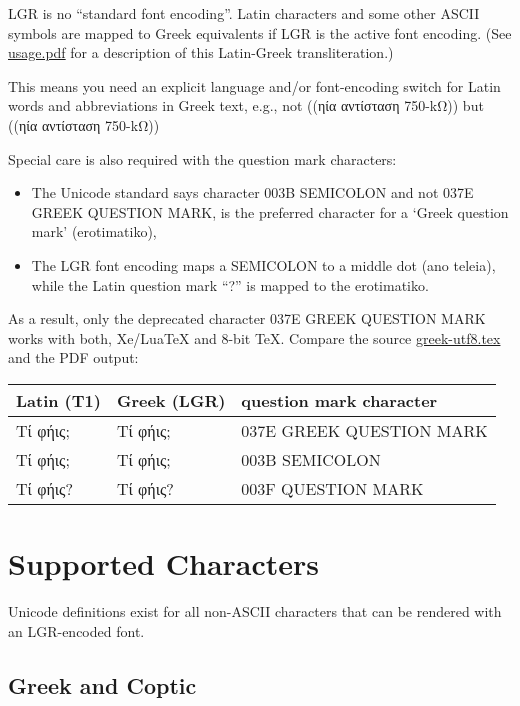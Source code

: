 \documentclass[a4paper]{article}
\begin{document}
{LGR is no ``standard font encoding''. Latin characters and some other ASCII
symbols are mapped to Greek equivalents if LGR is the active font encoding.
(See
\href{http://mirrors.ctan.org/macros/latex/contrib/babel-contrib/greek/usage.pdf}{usage.pdf}
for a description of this Latin-Greek transliteration.)

This means you need an explicit language and/or font-encoding switch for
Latin words and abbreviations in Greek text, e.g., not
\foreignlanguage{greek}{((ηία αντίσταση 750-kΩ))} but
\foreignlanguage{greek}{((ηία αντίσταση 750-\textlatin{k}Ω))}

Special care is also required with the question mark characters:
\begin{itemize}
  \item The Unicode standard says character 003B SEMICOLON and not 037E GREEK
  	QUESTION MARK, is the preferred character for a `Greek question
	mark' (erotimatiko),
  \item The LGR font encoding maps a SEMICOLON to a middle dot (ano teleia),
	while the Latin question mark ``?'' is mapped to the erotimatiko.
\end{itemize}
As a result, only the deprecated character 037E GREEK QUESTION MARK works
with both, Xe/LuaTeX and 8-bit TeX. Compare the source \url{greek-utf8.tex}
and the PDF output:

\begin{center}
\begin{tabular}{lll}
  Latin (T1) & Greek (LGR) & question mark character \\
  \midrule
  Τί φήις; & \foreignlanguage{greek}{Τί φήις;} & 037E GREEK QUESTION MARK \\
  Τί φήις; & \foreignlanguage{greek}{Τί φήις;} & 003B SEMICOLON \\
  Τί φήις? & \foreignlanguage{greek}{Τί φήις?} & 003F QUESTION MARK \\
\end{tabular}
\end{center}


\section{Supported Characters}

Unicode definitions exist for all non-ASCII characters that can be rendered
with an LGR-encoded font.


\subsection{Greek and Coptic}

}
\end{document}
